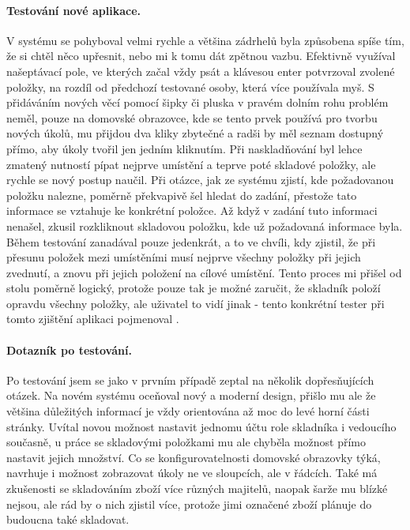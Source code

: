 \paragraph{Testování nové aplikace.} V systému se pohyboval velmi rychle a většina zádrhelů byla způsobena spíše tím, že si chtěl něco upřesnit, nebo mi k tomu dát zpětnou vazbu. Efektivně využíval našeptávací pole, ve kterých začal vždy psát a klávesou enter potvrzoval zvolené položky, na rozdíl od předchozí testované osoby, která více používala myš. S přidáváním nových věcí pomocí šipky či pluska v pravém dolním rohu problém neměl, pouze na domovské obrazovce, kde se tento prvek používá pro tvorbu nových úkolů, mu přijdou dva kliky zbytečné a radši by měl seznam dostupný přímo, aby úkoly tvořil jen jedním kliknutím. Při naskladňování byl lehce zmatený nutností pípat nejprve umístění a teprve poté skladové položky, ale rychle se nový postup naučil. Při otázce, jak ze systému zjistí, kde požadovanou položku nalezne, poměrně překvapivě šel hledat do zadání, přestože tato informace se vztahuje ke konkrétní položce. Až když v zadání tuto informaci nenašel, zkusil rozkliknout skladovou položku, kde už požadovaná informace byla. Během testování zanadával pouze jedenkrát, a to ve chvíli, kdy zjistil, že při přesunu položek mezi umístěními musí nejprve všechny položky  při jejich zvednutí, a znovu při jejich položení na cílové umístění. Tento proces mi přišel od stolu poměrně logický, protože pouze tak je možné zaručit, že skladník položí opravdu všechny položky, ale uživatel to vidí jinak - tento konkrétní tester při tomto zjištění aplikaci pojmenoval .

\paragraph{Dotazník po testování.} Po testování jsem se jako v prvním případě zeptal na několik dopřesňujících otázek. Na novém systému oceňoval nový a moderní design, přišlo mu ale že většina důležitých informací je vždy orientována až moc do levé horní části stránky. Uvítal novou možnost nastavit jednomu účtu role skladníka i vedoucího současně, u práce se skladovými položkami mu ale chyběla možnost přímo nastavit jejich množství. Co se konfigurovatelnosti domovské obrazovky týká, navrhuje i možnost zobrazovat úkoly ne ve sloupcích, ale v řádcích. Také má zkušenosti se skladováním zboží více různých majitelů, naopak šarže mu blízké nejsou, ale rád by o nich zjistil více, protože jimi označené zboží plánuje do budoucna také skladovat.

